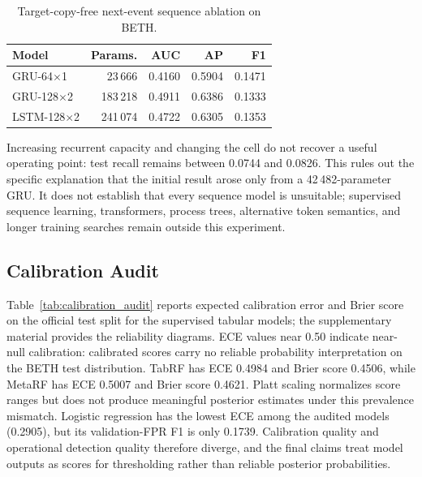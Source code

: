 \documentclass[10pt,journal,compsoc]{IEEEtran}
\begin{document}
\begin{table}[t]
\centering
\caption{Target-copy-free next-event sequence ablation on BETH.}
\label{tab:sequence_ablation}
\begin{tabular}{lrrrr}
\toprule
\textbf{Model} & \textbf{Params.} & \textbf{AUC} & \textbf{AP} & \textbf{F1} \\
\midrule
GRU-64$\times$1 & 23\,666 & 0.4160 & 0.5904 & 0.1471 \\
GRU-128$\times$2 & 183\,218 & 0.4911 & 0.6386 & 0.1333 \\
LSTM-128$\times$2 & 241\,074 & 0.4722 & 0.6305 & 0.1353 \\
\bottomrule
\end{tabular}
\end{table}

Increasing recurrent capacity and changing the cell do not recover a useful operating point: test recall remains between 0.0744 and 0.0826. This rules out the specific explanation that the initial result arose only from a 42\,482-parameter GRU. It does not establish that every sequence model is unsuitable; supervised sequence learning, transformers, process trees, alternative token semantics, and longer training searches remain outside this experiment.

\subsection{Calibration Audit}

Table~\ref{tab:calibration_audit} reports expected calibration error and Brier score on the official test split for the supervised tabular models; the supplementary material provides the reliability diagrams. ECE values near 0.50 indicate near-null calibration: calibrated scores carry no reliable probability interpretation on the BETH test distribution. TabRF has ECE 0.4984 and Brier score 0.4506, while MetaRF has ECE 0.5007 and Brier score 0.4621. Platt scaling normalizes score ranges but does not produce meaningful posterior estimates under this prevalence mismatch. Logistic regression has the lowest ECE among the audited models (0.2905), but its validation-FPR F1 is only 0.1739. Calibration quality and operational detection quality therefore diverge, and the final claims treat model outputs as scores for thresholding rather than reliable posterior probabilities.
\end{document}
